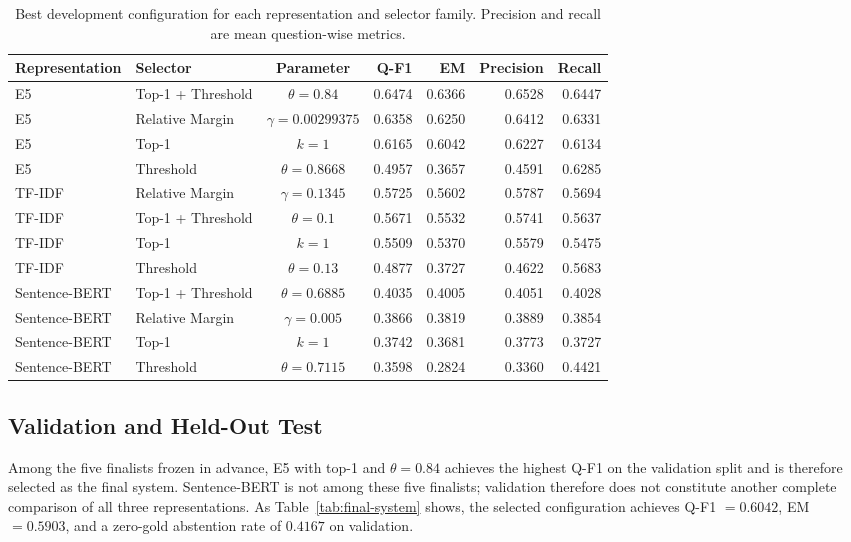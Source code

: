 \documentclass[11pt]{article}
\begin{document}
\begin{table}[t]
\centering
\small
\begin{tabular}{llcrrrr}
\toprule
\textbf{Representation} & \textbf{Selector} & \textbf{Parameter} & \textbf{Q-F1} & \textbf{EM} & \textbf{Precision} & \textbf{Recall} \\
\midrule
E5 & Top-1 + Threshold & $\theta=0.84$ & 0.6474 & 0.6366 & 0.6528 & 0.6447 \\
E5 & Relative Margin & $\gamma=0.00299375$ & 0.6358 & 0.6250 & 0.6412 & 0.6331 \\
E5 & Top-1 & $k=1$ & 0.6165 & 0.6042 & 0.6227 & 0.6134 \\
E5 & Threshold & $\theta=0.8668$ & 0.4957 & 0.3657 & 0.4591 & 0.6285 \\
TF-IDF & Relative Margin & $\gamma=0.1345$ & 0.5725 & 0.5602 & 0.5787 & 0.5694 \\
TF-IDF & Top-1 + Threshold & $\theta=0.1$ & 0.5671 & 0.5532 & 0.5741 & 0.5637 \\
TF-IDF & Top-1 & $k=1$ & 0.5509 & 0.5370 & 0.5579 & 0.5475 \\
TF-IDF & Threshold & $\theta=0.13$ & 0.4877 & 0.3727 & 0.4622 & 0.5683 \\
Sentence-BERT & Top-1 + Threshold & $\theta=0.6885$ & 0.4035 & 0.4005 & 0.4051 & 0.4028 \\
Sentence-BERT & Relative Margin & $\gamma=0.005$ & 0.3866 & 0.3819 & 0.3889 & 0.3854 \\
Sentence-BERT & Top-1 & $k=1$ & 0.3742 & 0.3681 & 0.3773 & 0.3727 \\
Sentence-BERT & Threshold & $\theta=0.7115$ & 0.3598 & 0.2824 & 0.3360 & 0.4421 \\
\bottomrule
\end{tabular}
\caption{Best development configuration for each representation and selector family. Precision and recall are mean question-wise metrics.}
\label{tab:development-results}
\end{table}

\subsection{Validation and Held-Out Test}

Among the five finalists frozen in advance, E5 with top-1 and $\theta=0.84$ achieves the highest Q-F1 on the validation split and is therefore selected as the final system. Sentence-BERT is not among these five finalists; validation therefore does not constitute another complete comparison of all three representations. As Table~\ref{tab:final-system} shows, the selected configuration achieves Q-F1 $=0.6042$, EM $=0.5903$, and a zero-gold abstention rate of $0.4167$ on validation.
\end{document}
